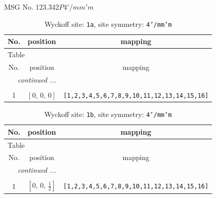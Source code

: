 \documentclass[fleqn,8pt]{jsarticle}
\begin{document}
\setcounter{MaxMatrixCols}{32}

\renewcommand{\tablename}{Table~}
\renewcommand{\figurename}{Figure~}
\begin{center}
\LARGE
MSG No. 123.342\quad$P4'/mm'm$
\end{center}
\renewcommand{\arraystretch}{1.2}
\begin{longtable}{ccc}
\caption{Wyckoff site: {\tt 1a}, site symmetry: {\tt 4'/mm'm}}
 \\
 \hline \hline
No. & position & mapping \\ \hline \endfirsthead

\multicolumn{2}{l}{\tablename\ \thetable{}} \\
 \hline \hline
No. & position & mapping \\ \hline \endhead

 \hline \hline
\multicolumn{2}{r}{\footnotesize\it continued ...} \\ \endfoot

 \hline \hline
\multicolumn{2}{r}{} \\ \endlastfoot

1 & $\left[ 0,\, 0,\, 0 \right]$ & {\tt [1,2,3,4,5,6,7,8,9,10,11,12,13,14,15,16]} \\
\end{longtable}
\renewcommand{\arraystretch}{1.2}
\begin{longtable}{ccc}
\caption{Wyckoff site: {\tt 1b}, site symmetry: {\tt 4'/mm'm}}
 \\
 \hline \hline
No. & position & mapping \\ \hline \endfirsthead

\multicolumn{2}{l}{\tablename\ \thetable{}} \\
 \hline \hline
No. & position & mapping \\ \hline \endhead

 \hline \hline
\multicolumn{2}{r}{\footnotesize\it continued ...} \\ \endfoot

 \hline \hline
\multicolumn{2}{r}{} \\ \endlastfoot

1 & $\left[ 0,\, 0,\, \frac{1}{2} \right]$ & {\tt [1,2,3,4,5,6,7,8,9,10,11,12,13,14,15,16]} \\
\end{longtable}
\renewcommand{\arraystretch}{1.2}
\end{document}
